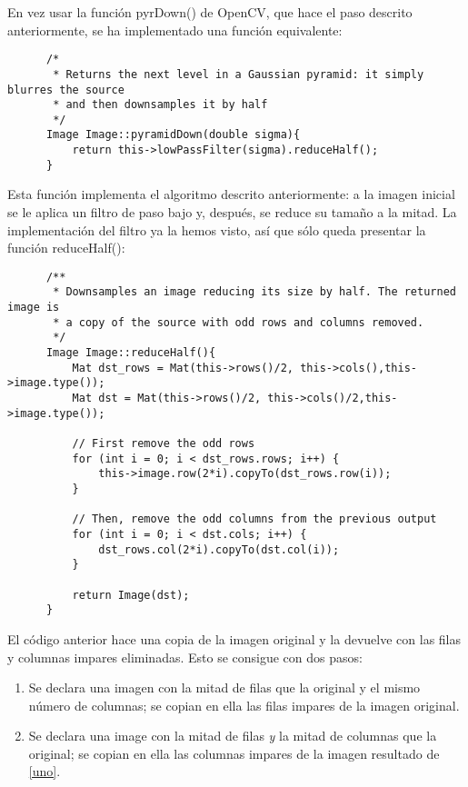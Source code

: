 \documentclass[a4paper, 11pt]{article}
\theoremstyle{definition}
\theoremstyle{theorem}
\begin{document}
  En vez usar la función pyrDown() de OpenCV, que hace el paso descrito anteriormente, se ha implementado una función equivalente:

  \begin{lstlisting}
      /*
       * Returns the next level in a Gaussian pyramid: it simply blurres the source
       * and then downsamples it by half
       */
      Image Image::pyramidDown(double sigma){
          return this->lowPassFilter(sigma).reduceHalf();
      }
  \end{lstlisting}

  Esta función implementa el algoritmo descrito anteriormente: a la imagen inicial se le aplica un filtro de paso bajo y, después, se reduce su tamaño a la mitad. La implementación del filtro ya la hemos visto, así que sólo queda presentar la función reduceHalf():

  \begin{lstlisting}
      /**
       * Downsamples an image reducing its size by half. The returned image is
       * a copy of the source with odd rows and columns removed.
       */
      Image Image::reduceHalf(){
          Mat dst_rows = Mat(this->rows()/2, this->cols(),this->image.type());
          Mat dst = Mat(this->rows()/2, this->cols()/2,this->image.type());

          // First remove the odd rows
          for (int i = 0; i < dst_rows.rows; i++) {
              this->image.row(2*i).copyTo(dst_rows.row(i));
          }

          // Then, remove the odd columns from the previous output
          for (int i = 0; i < dst.cols; i++) {
              dst_rows.col(2*i).copyTo(dst.col(i));
          }

          return Image(dst);
      }
  \end{lstlisting}

  El código anterior hace una copia de la imagen original y la devuelve con las filas y columnas impares eliminadas. Esto se consigue con dos pasos:
  \begin{enumerate}
      \item Se declara una imagen con la mitad de filas que la original y el mismo número de columnas; se copian en ella las filas impares de la imagen original. \label{uno}
      \item Se declara una image con la mitad de filas \emph{y} la mitad de columnas que la original; se copian en ella las columnas impares de la imagen resultado de \ref{uno}.
  \end{enumerate}
\end{document}
